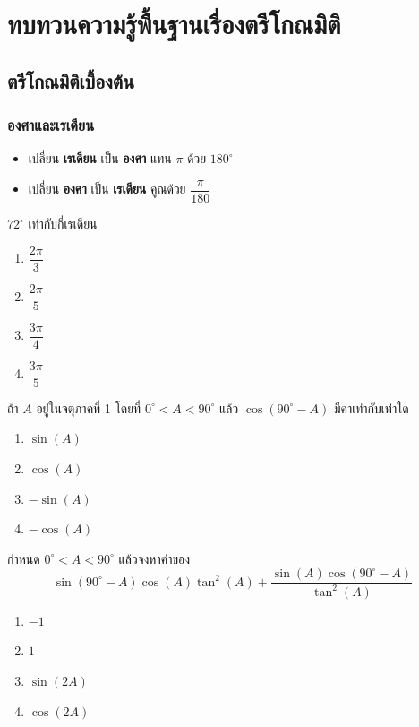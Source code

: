 \chapter{ทบทวนความรู้พื้นฐานเรื่องตรีโกณมิติ}
\section{ตรีโกณมิติเบื้องต้น}
\subsection{องศาและเรเดียน}
\begin{conceptbox}
 \begin{itemize}
    \item[*] เปลี่ยน \textbf{เรเดียน} เป็น \textbf{องศา} แทน $\pi$ ด้วย $180^{\circ}$ 
    \item[*] เปลี่ยน \textbf{องศา} เป็น \textbf{เรเดียน} คูณด้วย $\dfrac{\pi}{180}$
\end{itemize}   
\end{conceptbox}

\begin{examplebox}  
$72^{\circ}$ เท่ากับกี่เรเดียน
\begin{enumerate}
\item $\dfrac{2\pi}{3}$
\item $\dfrac{2\pi}{5}$
\item $\dfrac{3\pi}{4}$
\item $\dfrac{3\pi}{5}$
\end{enumerate}
\end{examplebox}

\newpage
\begin{examplebox}
ถ้า $A$ อยู่ในจตุภาคที่ 1 โดยที่ $0^{\circ}<A<90^{\circ}$ แล้ว $\cos(90^{\circ}-A)$ มีค่าเท่ากับเท่าใด
\begin{enumerate}
\item $\sin(A)$
\item $\cos(A)$
\item $-\sin(A)$
\item $-\cos(A)$
\end{enumerate}
\end{examplebox}

\begin{examplebox}
กำหนด $0^{\circ}<A<90^{\circ}$ แล้วจงหาค่าของ 
\[\sin(90^{\circ}-A)\cos(A)\tan^2(A)+\dfrac{\sin(A) \cos(90^{\circ}-A)}{\tan^2(A)}\]
\begin{enumerate}
\item $-1$
\item $1$
\item $\sin(2A)$
\item $\cos(2A)$
\end{enumerate}
\end{examplebox}

